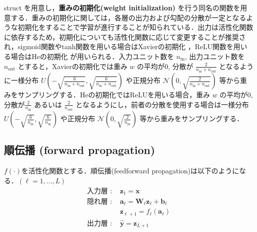 struct を用意し，\textbf{重みの初期化(weight initialization)} を行う同名の関数を用意する．重みの初期化に関しては，各層の出力および勾配の分散が一定となるような初期化をすることで学習が進行することが知られている．出力は活性化関数に依存するため，初期化についても活性化関数に応じて変更することが推奨され，sigmoid関数やtanh関数を用いる場合はXavierの初期化 \citep{Glorot2010-iu}，ReLU関数を用いる場合はHeの初期化 \citep{He2015-fs} が用いられる．入力ユニット数を $n_{\textrm{in}}$, 出力ユニット数を $n_{\textrm{out}}$ とすると，Xavierの初期化では重み $w$ の平均が0, 分散が $\frac{2}{n_{\textrm{in}}+n_{\textrm{out}}}$ となるように一様分布 $U\left(-\sqrt{\frac{6}{n_{\textrm{in}}+n_{\textrm{out}}}}, \sqrt{\frac{6}{n_{\textrm{in}}+n_{\textrm{out}}}}\right)$ や正規分布 $\mathcal{N}\left(0, \sqrt{\frac{2}{n_{\textrm{in}}+n_{\textrm{out}}}}\right)$ 等から重みをサンプリングする．Heの初期化ではReLUを用いる場合，重み $w$ の平均が0, 分散が$\frac{2}{n_{\textrm{in}}}$ あるいは $\frac{2}{n_{\textrm{out}}}$ となるようにし，前者の分散を使用する場合は一様分布 $U\left(-\sqrt{\frac{6}{n_{\textrm{in}}}}, \sqrt{\frac{6}{n_{\textrm{in}}}}\right)$ や正規分布 $\mathcal{N}\left(0, \sqrt{\frac{2}{n_{\textrm{in}}}}\right)$ 等から重みをサンプリングする．
\subsection{順伝播 (forward propagation)}
$f(\cdot)$を活性化関数とする．順伝播(feedforward propagation)は以下のようになる．$(\ell=1,\ldots,L)$
\begin{align}
\text{入力層 : }&\mathbf{z}_1=\mathbf{x}\\
\text{隠れ層 : }&\mathbf{a}_\ell=\mathbf{W}_\ell \mathbf{z}_\ell +\mathbf{b}_\ell\\
&\mathbf{z}_{\ell+1}=f_\ell\left(\mathbf{a}_\ell\right)\\
\text{出力層 : }&\hat{\mathbf{y}}=\mathbf{z}_{L+1}
\end{align}
